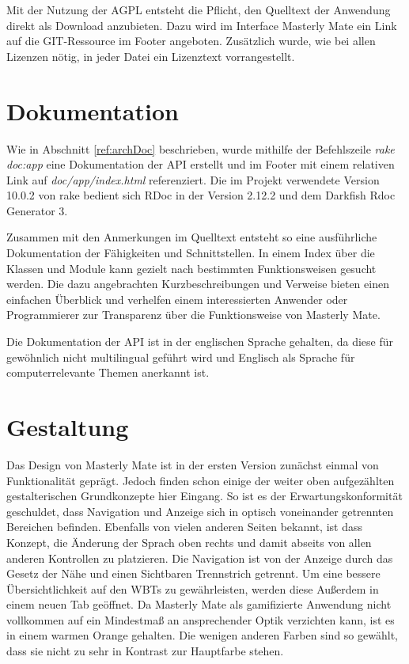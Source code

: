 Mit der Nutzung der AGPL entsteht die Pflicht, den Quelltext der Anwendung
direkt als Download anzubieten. Dazu wird im Interface Masterly Mate
ein Link auf die GIT-Ressource im Footer angeboten. Zusätzlich wurde, wie bei
allen Lizenzen nötig, in jeder Datei ein Lizenztext vorrangestellt.

\section{Dokumentation}
Wie in Abschnitt \ref{ref:archDoc} beschrieben, wurde mithilfe der Befehlszeile
\textit{rake doc:app} eine Dokumentation der API erstellt und im Footer
mit einem relativen Link auf \textit{doc/app/index.html} referenziert. Die im
Projekt verwendete Version 10.0.2 von rake bedient sich RDoc in der Version
2.12.2 und dem Darkfish Rdoc Generator 3.

Zusammen mit den Anmerkungen im Quelltext entsteht so eine ausführliche
Dokumentation der Fähigkeiten und Schnittstellen. In einem Index über die
Klassen und Module kann gezielt nach bestimmten Funktionsweisen gesucht werden.
Die dazu angebrachten Kurzbeschreibungen und Verweise bieten einen einfachen
Überblick und verhelfen einem interessierten Anwender oder Programmierer zur
Transparenz über die Funktionsweise von Masterly Mate.

Die Dokumentation der API ist in der englischen Sprache gehalten, da diese für
gewöhnlich nicht multilingual geführt wird und Englisch als Sprache für
computerrelevante Themen anerkannt ist.

\section{Gestaltung}
Das Design von Masterly Mate ist in der ersten Version zunächst einmal von
Funktionalität geprägt. Jedoch finden schon einige der weiter oben aufgezählten
gestalterischen Grundkonzepte hier Eingang. So ist es der Erwartungskonformität
geschuldet, dass Navigation und Anzeige sich in optisch voneinander getrennten
Bereichen befinden. Ebenfalls von vielen anderen Seiten bekannt, ist dass
Konzept, die Änderung der Sprach oben rechts und damit abseits von allen anderen
Kontrollen zu platzieren. Die Navigation ist von der Anzeige durch das Gesetz
der Nähe und einen Sichtbaren Trennstrich getrennt. Um eine bessere
Übersichtlichkeit auf den WBTs zu gewährleisten, werden diese Außerdem in einem
neuen Tab geöffnet. Da Masterly Mate als gamifizierte Anwendung nicht vollkommen
auf ein Mindestmaß an ansprechender Optik verzichten kann, ist es in einem
warmen Orange gehalten. Die wenigen anderen Farben sind so gewählt, dass sie
nicht zu sehr in Kontrast zur Hauptfarbe stehen.

